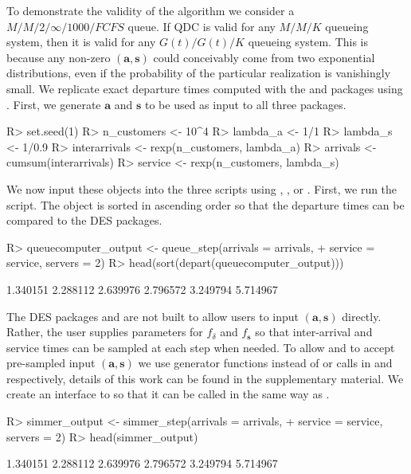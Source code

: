 \documentclass[article]{jss}
\begin{document}
To demonstrate the validity of the algorithm we consider a
$M/M/2/\infty/1000/\mathit{FCFS}$ queue. If QDC is valid for any
$M/M/K$ queueing system, then it is valid for any $G(t)/G(t)/K$
queueing system. This is because any non-zero $\mathbf{(a,s)}$ could
conceivably come from two exponential distributions, even if the
probability of the particular realization is vanishingly small. We
replicate exact departure times computed with the  and
 packages using . First, we generate
$\mathbf{a}$ and $\mathbf{s}$ to be used as input to all three
packages.
%
\begin{CodeChunk}
\begin{CodeInput}
R> set.seed(1)
R> n_customers <- 10^4
R> lambda_a <- 1/1
R> lambda_s <- 1/0.9
R> interarrivals <- rexp(n_customers, lambda_a)
R> arrivals <- cumsum(interarrivals)
R> service <- rexp(n_customers, lambda_s)
\end{CodeInput}  
\end{CodeChunk}
%
We now input these objects into the three scripts using , , or . First, we run the  script. The  object is sorted in ascending order so that the departure times can be compared to the DES packages.
%
\begin{CodeChunk}
\begin{Sinput}
R> queuecomputer_output <- queue_step(arrivals = arrivals, 
+    service = service, servers = 2)
R> head(sort(depart(queuecomputer_output)))
\end{Sinput}
\begin{Soutput}
[1] 1.340151 2.288112 2.639976 2.796572 3.249794 5.714967
\end{Soutput}
\end{CodeChunk}
%
The DES packages  and  are not built to allow
users to input $(\mathbf{a,s})$ directly. Rather, the user supplies
parameters for $f_{\delta}$ and $f_{\mathbf{s}}$ so that inter-arrival
and service times can be sampled at each step when needed. To allow
 and  to accept pre-sampled input
$(\mathbf{a,s})$ we use generator functions instead of
 or  calls in
 and  respectively, details of this work
can be found in the supplementary material. We create an interface to
 so that it can be called in the same way as
.
%
\begin{CodeChunk}
\begin{Sinput}
R> simmer_output <- simmer_step(arrivals = arrivals, 
+    service = service, servers = 2)
R> head(simmer_output)
\end{Sinput}
\begin{Soutput}
[1] 1.340151 2.288112 2.639976 2.796572 3.249794 5.714967
\end{Soutput}
\end{CodeChunk}
\end{document}
